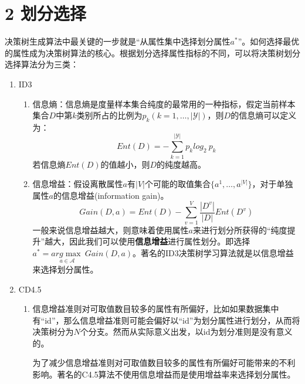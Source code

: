 \documentclass[twoside]{article}
\begin{document}
\section*{2 划分选择}
决策树生成算法中最关键的一步就是“从属性集中选择划分属性$a^*$”。如何选择最优的属性成为决策树算法的核心。根据划分选择属性指标的不同，可以将决策树划分选择算法分为三类：
\begin{enumerate}
    \item ID3\\
    \begin{enumerate}
        \item 信息熵：信息熵是度量样本集合纯度的最常用的一种指标，假定当前样本集合$D$中第$k$类别所占的比例为$p_k(k=1,\ldots,|\mathcal{Y}|)$，则$D$的信息熵可以定义为：
        \begin{equation*}
            Ent(D)=-\sum_{k=1}^{\lvert \mathcal{Y} \rvert} p_k log_2 \ p_k
        \end{equation*}
        若信息熵$Ent(D)$的值越小，则$D$的纯度越高。
        \item 信息增益：假设离散属性$a$有$\lvert V \rvert$个可能的取值集合$\{a^1,\ldots,a^{|V|}\}$，对于单独属性$a$的信息增益(information gain)。
        \begin{equation*}
            Gain(D,a)=Ent(D)-\sum_{v=1}^{V}\frac{|D^{v}|}{|D|} Ent(D^v)
        \end{equation*}
        一般来说信息增益越大，则意味着使用属性$a$来进行划分所获得的“纯度提升”越大，因此我们可以使用\textbf{信息增益}进行属性划分。即选择$a^*=\underset{a\in\mathcal{A}}{arg\max}~Gain(D,a)$。著名的ID3决策树学习算法就是以信息增益来选择划分属性。
    
    \end{enumerate}
    \item CD4.5\\
    \begin{enumerate}
        \item 信息增益准则对可取值数目较多的属性有所偏好，比如如果数据集中有“id”，那么信息增益准则可能会偏好以“id”为划分属性进行划分，从而将决策树分为$N$个分支。然而从实际意义出发，以id为划分准则是没有意义的。
        
        为了减少信息增益准则对可取值数目较多的属性有所偏好可能带来的不利影响。著名的C4.5算法不使用信息增益而是使用增益率来选择划分属性。


\end{enumerate}
\end{enumerate}
\end{document}
